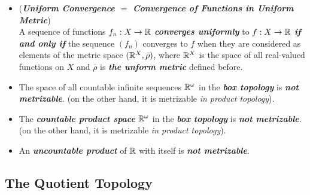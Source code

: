 \documentclass[11pt]{article}
\begin{document}
\begin{itemize}
\item \begin{remark} (\emph{\textbf{Uniform Convergence $=$ Convergence of Functions in Uniform Metric}})\\
A sequence of functions $f_n : X \rightarrow {\mathbb R}$ \emph{\textbf{converges uniformly}} to $f: X \rightarrow {\mathbb R}$ \emph{\textbf{if and only if}} the sequence $(f_n)$ converges to $f$ when they are considered as elements of the metric space $({\mathbb R}^{X}, \bar{\rho})$, where ${\mathbb R}^{X}$ is the space of all real-valued functions on $X$ and $\bar{\rho}$ is \emph{\textbf{the unform metric}} defined before.
\end{remark}

\item \begin{example} 
The space of all countable infinite sequences ${\mathbb R}^{\omega}$ in the \emph{\textbf{box topology}} is \emph{\textbf{not metrizable}}. (on the other hand,  it is metrizable \emph{in product topology}).
\end{example}

\item \begin{example} 
The \emph{\textbf{countable product space}} ${\mathbb R}^{\omega}$ in the \emph{\textbf{box topology}} is \emph{\textbf{not metrizable}}. (on the other hand,  it is metrizable \emph{in product topology}).
\end{example}



\item \begin{example}
An \emph{\textbf{uncountable product}} of ${\mathbb R}$ with itself is \emph{\textbf{not metrizable}}.
\end{example}
\end{itemize}

\subsection{The Quotient Topology}
\end{document}
